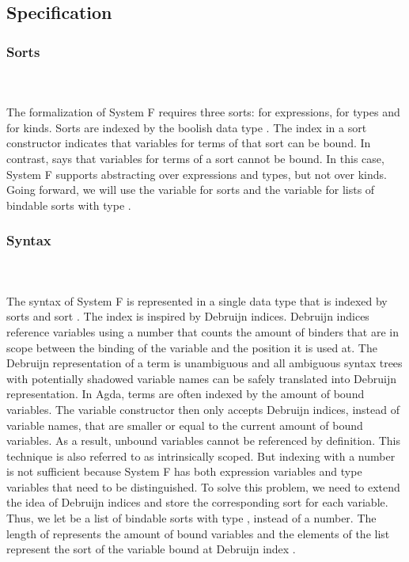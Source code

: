 \subsection{Specification}
\subsubsection{Sorts}\hfill\\\\
The formalization of System F requires three sorts:  for expressions,  for types and  for kinds. 
\FSort
Sorts are indexed by the boolish data type . 
The index  in a sort constructor indicates that variables for terms of that sort can be bound. 
In contrast,  says that variables for terms of a sort cannot be bound. 
In this case, System F supports abstracting over expressions and types, but not over kinds. 
Going forward, we will use the variable  for sorts and the variable  for lists of bindable sorts with type \FSorts.

\subsubsection{Syntax}\hfill\\\\
The syntax of System F is represented in a single data type  that is indexed by sorts  and sort . 
The index  is inspired by Debruijn indices. 
Debruijn indices reference variables using a number that counts the amount of binders that are in scope between the binding of the variable and the position it is used at. 
The Debruijn representation of a term is unambiguous and all ambiguous syntax trees with potentially shadowed variable names can be safely translated into Debruijn representation. 
In Agda, terms are often indexed by the amount of bound variables. 
The variable constructor then only accepts Debruijn indices, instead of variable names, that are smaller or equal to the current amount of bound variables.
As a result, unbound variables cannot be referenced by definition. 
This technique is also referred to as intrinsically scoped.
But indexing  with a number is not sufficient because System F has both expression variables and type variables that need to be distinguished. 
To solve this problem, we need to extend the idea of Debruijn indices and store the corresponding sort for each variable. Thus, we let  be a list of bindable sorts with type , instead of a number.
The length of  represents the amount of bound variables and the elements  of the list represent the sort of the variable bound at Debruijn index . 

